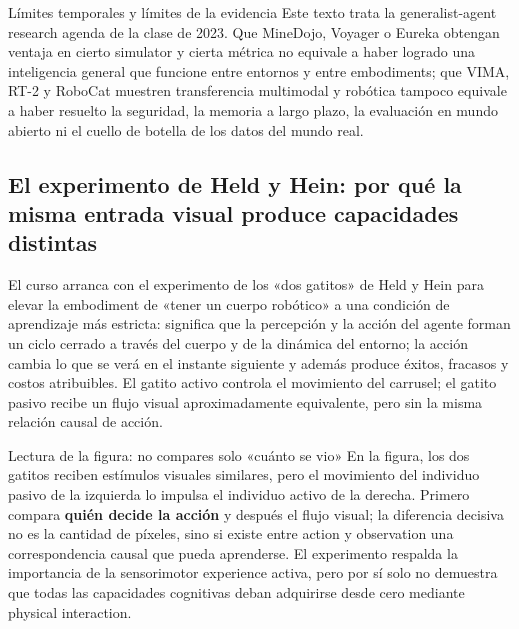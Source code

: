 \begin{warningbox}{Límites temporales y límites de la evidencia}
Este texto trata la generalist-agent research agenda de la clase de 2023. Que MineDojo, Voyager o Eureka obtengan ventaja en cierto simulator y cierta métrica no equivale a haber logrado una inteligencia general que funcione entre entornos y entre embodiments; que VIMA, RT-2 y RoboCat muestren transferencia multimodal y robótica tampoco equivale a haber resuelto la seguridad, la memoria a largo plazo, la evaluación en mundo abierto ni el cuello de botella de los datos del mundo real.
\end{warningbox}

\subsection{El experimento de Held y Hein: por qué la misma entrada visual produce capacidades distintas}

El curso arranca con el experimento de los «dos gatitos» de Held y Hein para elevar la embodiment de «tener un cuerpo robótico» a una condición de aprendizaje más estricta:  significa que la percepción y la acción del agente forman un ciclo cerrado a través del cuerpo y de la dinámica del entorno; la acción cambia lo que se verá en el instante siguiente y además produce éxitos, fracasos y costos atribuibles. El gatito activo controla el movimiento del carrusel; el gatito pasivo recibe un flujo visual aproximadamente equivalente, pero sin la misma relación causal de acción.


\begin{knowledgebox}{Lectura de la figura: no compares solo «cuánto se vio»}
En la figura, los dos gatitos reciben estímulos visuales similares, pero el movimiento del individuo pasivo de la izquierda lo impulsa el individuo activo de la derecha. Primero compara \textbf{quién decide la acción} y después el flujo visual; la diferencia decisiva no es la cantidad de píxeles, sino si existe entre action y observation una correspondencia causal que pueda aprenderse. El experimento respalda la importancia de la sensorimotor experience activa, pero por sí solo no demuestra que todas las capacidades cognitivas deban adquirirse desde cero mediante physical interaction.
\end{knowledgebox}


